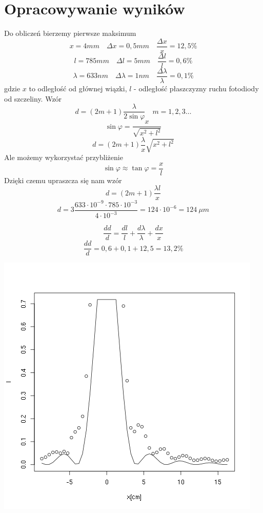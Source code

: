 \documentclass[11pt]{article}
\author{Łukasz Dubiel}
\begin{document}
\section{Opracowywanie wyników}
Do obliczeń bierzemy pierwsze maksimum
$$ x = 4 mm \quad \Delta x = 0,5 mm \quad \frac{\Delta x}{x} = 12,5\% $$
$$ l = 785mm \quad \Delta l = 5mm \quad \frac{\Delta l}{l} = 0,6 \% $$
$$ \lambda = 633 nm \quad \Delta \lambda = 1 nm \quad \frac{\Delta \lambda}{\lambda} = 0,1 \%$$
gdzie $x$ to odległość od głównej wiązki, $l$ - odległość płaszczyzny ruchu fotodiody od szczeliny. 
Wzór $$ d = (2m + 1) \frac{\lambda}{2 \sin{\varphi}} \quad m = 1,2,3\ldots $$
$$ \sin{\varphi} = \frac{x}{\sqrt{x^2 + l^2}} $$ 
$$ d = (2m + 1) \frac{\lambda}{x} \sqrt{x^2 + l^2} $$
Ale możemy wykorzystać przybliżenie
$$ \sin{\varphi} \approx \tan{\varphi} = \frac{x}{l} $$ 
Dzięki czemu upraszcza się nam wzór 
$$ d = (2m+1) \frac{\lambda l }{x} $$
$$ d = 3 \frac{633 \cdot 10^{-9} \cdot 785 \cdot 10^{-3}}{4 \cdot 10^{-3}} = 124 \cdot 10^{-6} = 124\ \mu m $$

$$\frac{dd}{d} = \frac{dl}{l} + \frac{d\lambda}{\lambda} + \frac{dx}{x} $$
$$ \frac{dd}{d} = 0,6 + 0,1 + 12,5 = 13,2 \% $$

\newpage

\includegraphics{wykres.png}
\end{document}
